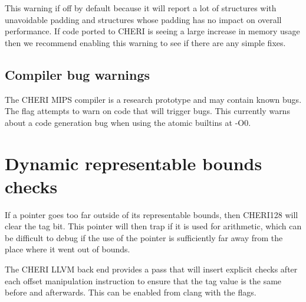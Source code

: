 This warning if off by default because it will report a lot of structures with unavoidable padding and structures whose padding has no impact on overall performance.
If code ported to CHERI is seeing a large increase in memory usage then we recommend enabling this warning to see if there are any simple fixes.

\subsection{Compiler bug warnings}

The CHERI MIPS compiler is a research prototype and may contain known bugs.
The  flag attempts to warn on code that will trigger bugs.
This currently warns about a code generation bug when using the atomic builtins at -O0.

\section{Dynamic representable bounds checks}

If a pointer goes too far outside of its representable bounds, then CHERI128 will clear the tag bit.
This pointer will then trap if it is used for arithmetic, which can be difficult to debug if the use of the pointer is sufficiently far away from the place where it went out of bounds.

The CHERI LLVM back end provides a pass that will insert explicit checks after each offset manipulation instruction to ensure that the tag value is the same before and afterwards.
This can be enabled from clang with the  flags.

